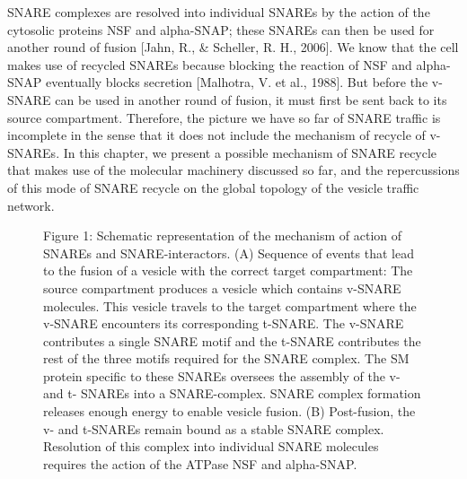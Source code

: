 \documentclass[preprint,12pt]{elsarticle}
\begin{document}
SNARE complexes are resolved into individual SNAREs by the action of the cytosolic proteins NSF and alpha-SNAP; these SNAREs can then be used for another round of fusion [Jahn, R., \& Scheller, R. H., 2006]. We know that the cell makes use of recycled SNAREs because blocking the reaction of NSF and alpha-SNAP eventually blocks secretion [Malhotra, V. et al., 1988]. But before the v-SNARE can be used in another round of fusion, it must first be sent back to its source compartment. Therefore, the picture we have so far of SNARE traffic is
incomplete in the sense that it does not include the mechanism of recycle of v-SNAREs. In this chapter, we present a possible mechanism of SNARE recycle that makes use of the molecular machinery discussed so far, and the repercussions of this mode of SNARE recycle on the global topology of the vesicle traffic network.

\begin{figure}[!ht]
  \caption{Figure 1: Schematic representation of the mechanism of action of SNAREs and SNARE-interactors. (A) Sequence of events that lead to the fusion of a vesicle with the correct target compartment: The source compartment produces a vesicle which contains v-SNARE molecules. This vesicle travels to the target compartment where the v-SNARE encounters its corresponding t-SNARE. The v-SNARE contributes a single SNARE motif and the t-SNARE contributes the rest of the three motifs required for the SNARE complex. The SM protein specific to these SNAREs oversees the assembly of the v- and t- SNAREs into a SNARE-complex. SNARE complex formation releases enough energy to enable vesicle fusion. (B) Post-fusion, the v- and t-SNAREs remain bound as a stable SNARE complex. Resolution of this complex into individual SNARE molecules requires the action of the ATPase NSF and alpha-SNAP.}
  \centering
\end{figure}

\end{document}
